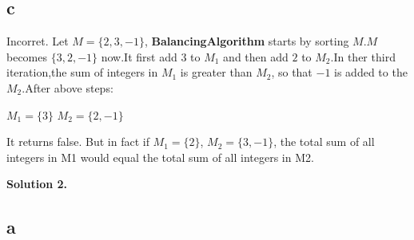 \documentclass[12pt]{article}
\newcommand{\solution}[1]{\noindent \textbf{Solution #1.}}
\begin{document}
    \subsection*{c} Incorret. Let $M = \{2,3,-1\}$, \textbf{BalancingAlgorithm} starts by sorting $M$.$M$ becomes $\{3,2,-1\}$ now.It first add $3$ to $M_1$ and then add $2$ to $M_2$.In ther third iteration,the sum of integers in $M_1$ is greater than  $M_2$, so that $-1$ is added to the $M_2$.After above steps:
    \begin{center}
        $M_1 = \{ 3\}$
        $M_2 = \{2,-1\}$ 
    \end{center}
    It returns false. But in fact if $M_1 = \{ 2\}$, $M_2 = \{3,-1\}$, the total sum of all integers in M1 would equal the total sum of all integers in M2.

\newpage

\solution{2}
    \subsection*{a}
\end{document}
